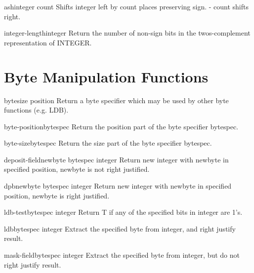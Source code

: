 \documentclass[10pt,english]{book}
\begin{document}
\begin{function}{ash}{integer count}
  Shifts integer left by count places preserving sign. - count shifts right.
\end{function}

\begin{function}{integer-length}{integer}
  Return the number of non-sign bits in the twos-complement representation
  of INTEGER.
\end{function}

\section{Byte Manipulation Functions}
\label{sec:byte-manip-funct}

\begin{function}{byte}{size position}
  Return a byte specifier which may be used by other byte functions
  (e.g. LDB).
\end{function}

\begin{function}{byte-position}{bytespec}
  Return the position part of the byte specifier bytespec.
\end{function}

\begin{function}{byte-size}{bytespec}
  Return the size part of the byte specifier bytespec.
\end{function}

\begin{function}{deposit-field}{newbyte bytespec integer}
  Return new integer with newbyte in specified position, newbyte is not right justified.
\end{function}

\begin{function}{dpb}{newbyte bytespec integer}
  Return new integer with newbyte in specified position, newbyte is right justified.
\end{function}

\begin{function}{ldb-test}{bytespec integer}
  Return T if any of the specified bits in integer are 1's.
\end{function}

\begin{accessor}{ldb}{bytespec integer}
  Extract the specified byte from integer, and right justify result.
\end{accessor}

\begin{accessor}{mask-field}{bytespec integer}
  Extract the specified byte from integer,  but do not right justify result.
\end{accessor}
\end{document}

